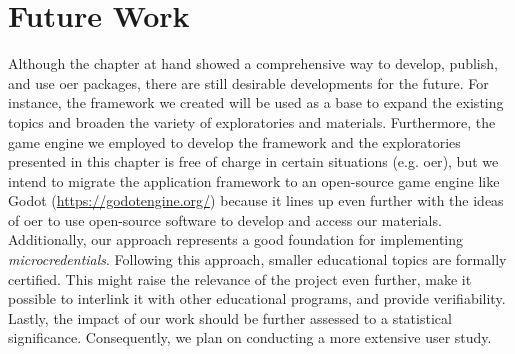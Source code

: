 \section{Future Work}
Although the chapter at hand showed a comprehensive way to develop, publish, and use \acrshort{oer} packages, there are still desirable developments for the future. For instance, the framework we created will be used as a base to expand the existing topics and broaden the variety of exploratories and materials. Furthermore, the game engine we employed to develop the framework and the exploratories presented in this chapter is free of charge in certain situations (e.g. \acrshort{oer}), but we intend to migrate the application framework to an open-source game engine like Godot (\url{https://godotengine.org/}) because it lines up even further with the ideas of \acrshort{oer} to use open-source software to develop and access our materials. Additionally, our approach represents a good foundation for implementing \emph{microcredentials}. Following this approach, smaller educational topics are formally certified. This might raise the relevance of the project even further, make it possible to interlink it with other educational programs, and provide verifiability. Lastly, the impact of our work should be further assessed to a statistical significance. Consequently, we plan on conducting a more extensive user study.